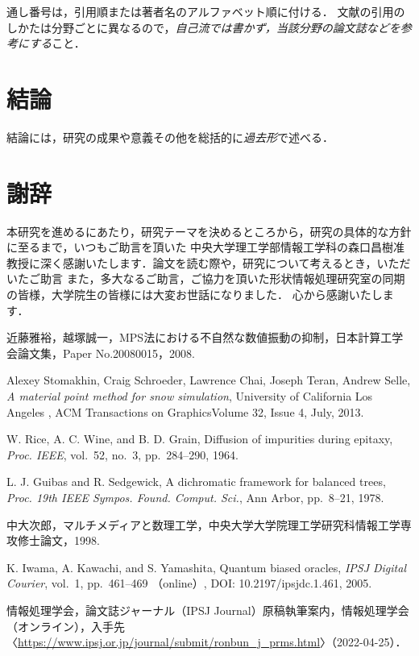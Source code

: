 \documentclass[a4j,12pt]{jreport}
\def\syaji{ \chapter*{謝辞} \addcontentsline{toc}{chapter}{謝辞}}
\begin{document}
通し番号は，引用順または著者名のアルファベット順に付ける．
文献の引用のしかたは分野ごとに異なるので，{\em 自己流では書かず，当該分野の論文誌などを参考にする}こと．



\chapter{結論} \label{chapter:6}

結論には，研究の成果や意義その他を総括的に{\em 過去形}で述べる．



\syaji
\par
本研究を進めるにあたり，研究テーマを決めるところから，研究の具体的な方針に至るまで，いつもご助言を頂いた
中央大学理工学部情報工学科の森口昌樹准教授に深く感謝いたします．論文を読む際や，研究について考えるとき，いただいたご助言
また，多大なるご助言，ご協力を頂いた形状情報処理研究室の同期の皆様，大学院生の皆様には大変お世話になりました．
心から感謝いたします．


\begin{thebibliography}{99}

近藤雅裕，越塚誠一，MPS法における不自然な数値振動の抑制，日本計算工学会論文集，Paper No.20080015，2008. 

Alexey Stomakhin, Craig Schroeder, Lawrence Chai, Joseph Teran, Andrew Selle, \textit{A material point method for snow simulation}, University of California Los Angeles , ACM Transactions on GraphicsVolume 32, Issue 4, July, 2013.

W. Rice, A. C. Wine, and B. D. Grain, Diffusion of impurities during epitaxy, \textit{Proc. IEEE}, vol.~52, no.~3, pp.~284--290, 1964.

L. J. Guibas and R. Sedgewick, A dichromatic framework for balanced trees, 
\textit{Proc. 19th IEEE Sympos. Found. Comput. Sci.}, Ann Arbor, pp.~8--21, 1978.

中大次郎，マルチメディアと数理工学，中央大学大学院理工学研究科情報工学専攻修士論文，1998.

K. Iwama, A. Kawachi, and S. Yamashita, Quantum biased oracles, \textit{IPSJ Digital Courier}, vol.~1, pp.~461--469 （online）, DOI: 10.2197/ipsjdc.1.461, 2005.

情報処理学会，論文誌ジャーナル（IPSJ Journal）原稿執筆案内，情報処理学会（オンライン），入手先〈\url{https://www.ipsj.or.jp/journal/submit/ronbun_j_prms.html}〉（2022-04-25）．


\end{thebibliography}

\end{document}
